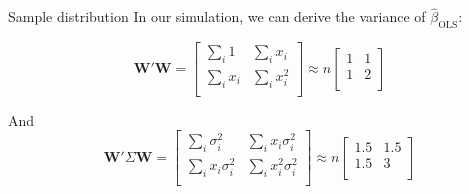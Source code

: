 \documentclass[aspectratio=169,t,11pt,table]{beamer}
\begin{document}
\begin{frame}{Sample distribution}
  In our simulation, we can derive the variance of $\hat{\beta}_{\text{OLS}}$:

  $$
    \bm{W}' \bm{W} = 
    \begin{bmatrix}
      \sum_i 1 & \sum_i x_i \\
      \sum_i x_i & \sum_i x_i^2 \\
    \end{bmatrix}
    \approx
    n 
    \begin{bmatrix}
      1 & 1 \\
      1 & 2 \\
    \end{bmatrix}
  $$

  And 
  $$ 
    \bm{W}' \Sigma \bm{W} = 
    \begin{bmatrix}
      \sum_i \sigma_i^2 & \sum_i x_i \sigma_i^2 \\
      \sum_i x_i \sigma_i^2 & \sum_i x_i^2 \sigma_i^2 \\
    \end{bmatrix}
    \approx
    n 
    \begin{bmatrix}
      1.5 & 1.5 \\
      1.5 & 3 \\
    \end{bmatrix}
  $$
\end{frame}
\end{document}

